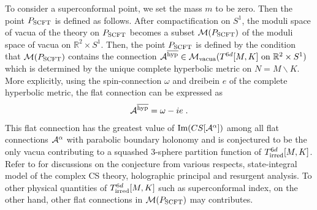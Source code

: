 \documentclass[a4paper,11pt]{article}
\def\a{\alpha}
\def\CA{{\cal A}}
\def\CM{{\cal M}}
\def\BR{{\mathbb R}}
\def\beq#1\eeq{\begin{align}#1\end{align}}
\begin{document}
To consider a superconformal point, we set the mass $m$ to be zero. 
Then the point $P_{\rm SCFT}$ is defined as follows.
After compactification on $S^1$, the moduli space of vacua of the theory on $P_{\rm SCFT}$ becomes
a subset $\CM(P_{\rm SCFT})$ of the moduli space of vacua on $\BR^2 \times S^1$.
Then, the point $P_{\rm SCFT}$ is defined by the condition that $\CM(P_{\rm SCFT})$ contains the connection 
$\CA^{\rm \overline{hyp}} \in \mathcal{M}_{\rm vacua} (\textrm{$T^{6d}[M,K]$ on $\mathbb{R}^2\times S^1$})$ 
which is determined by the unique complete hyperbolic metric on $N=M \backslash K$. 
More explicitly, using the spin-connection $\omega$ and dreibein $e$ of the complete hyperbolic metric, the flat connection can be expressed as
%
\begin{align}
\CA^{\rm \overline{hyp}} =  \omega - i e\;.
\end{align}
%
This flat connection has the greatest value of $\textrm{Im}(CS[\CA^\a])$ among all flat connections $\CA^\a$ with parabolic boundary holonomy and is conjectured to be the only vacua contributing to a squashed 3-sphere partition function \cite{Hama:2011ea} of  $T^{6d}_{\rm irred}[M,K]$.  Refer to  \cite{Andersen:2011bt,Gang:2014ema,Bae:2016jpi,Mikhaylov:2017ngi,Gang:2017hbs} for discussions on the  conjecture from various respects, state-integral model of the complex CS theory, holographic principal and resurgent analysis.   To other physical quantities of $T^{6d}_{\rm irred}[M,K]$ such as superconformal index,  on the other hand, other flat connections in  $\CM(P_{\rm SCFT})$ may contributes. 
\end{document}
